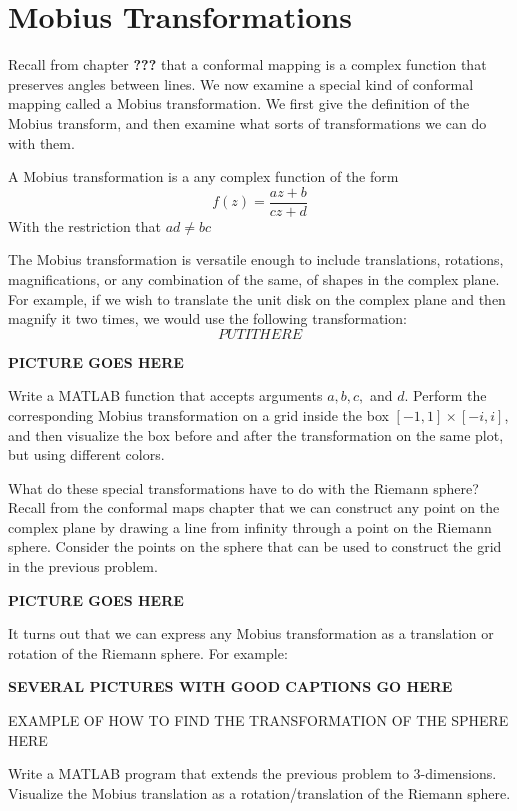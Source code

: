 \section{Mobius Transformations}

Recall from chapter {\bf ???} that a conformal mapping is a complex function that preserves angles between lines.  We now examine a special kind of conformal mapping called a Mobius transformation.  We first give the definition of the Mobius transform, and then examine what sorts of transformations we can do with them.

\begin{definition}  A Mobius transformation is a any complex function of the form
\[
f(z) = \frac{az + b}{cz + d}
\]
With the restriction that $ad \neq bc$
\end{definition}

The Mobius transformation is versatile enough to include translations, rotations, magnifications, or any combination of the same, of shapes in the complex plane.  For example, if we wish to translate the unit disk on the complex plane and then magnify it two times, we would use the following transformation:
\[
PUT IT HERE
\]

{\bf PICTURE GOES HERE}

\begin{problem} Write a MATLAB function that accepts arguments $a,b,c,$ and $d$.  Perform the corresponding Mobius transformation on a grid inside the box $[-1,1]\times[-i,i]$, and then visualize the box before and after the transformation on the same plot, but using different colors.
\end{problem}

What do these special transformations have to do with the Riemann sphere?  Recall from the conformal maps chapter that we can construct any point on the complex plane by drawing a line from infinity through a point on the Riemann sphere.  Consider the points on the sphere that can be used to construct the grid in the previous problem.

{\bf PICTURE GOES HERE}

It turns out that we can express any Mobius transformation as a translation or rotation of the Riemann sphere.  For example:

{\bf SEVERAL PICTURES WITH GOOD CAPTIONS GO HERE}

EXAMPLE OF HOW TO FIND THE TRANSFORMATION OF THE SPHERE HERE

\begin{problem}  Write a MATLAB program that extends the previous problem to 3-dimensions.  Visualize the Mobius translation as a rotation/translation of the Riemann sphere.
\end{problem}



